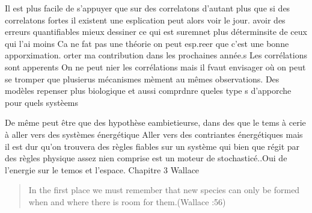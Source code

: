 Il est plus facile de s'appuyer que sur des correlatons d'autant plus
que si des correlatons fortes il existent une esplication peut alors
voir le jour. avoir des erreurs quantifiables mieux dessiner ce qui est
suremnet plus déterminsite de ceux qui l'ai moins Ca ne fat pas une
théorie on peut esp.reer que c'est une bonne apporximation. orter ma
contribution dans les prochaines année.s Les corrélations sont apperents
On ne peut nier les corrélations mais il fvaut envisager où on peut se
tromper que plusierus mécanismes mèment au mêmes observations. Des
modèles repenser plus biologique et aussi comprdnre queles type s
d'apporche pour quels systèems

De même peut être que des hypothèse eambietieurse, dans des que le tems
à cerie à aller vers des systèmes énergétique Aller vers des contriantes
énergétiques mais il est dur qu'on trouvera des règles fiables sur un
système qui bien que régit par des règles physique assez nien comprise
est un moteur de stochasticé..Oui de l'energie sur le temos et l'espace.
Chapitre 3 Wallace

\begin{quote}
In the first place we must remember that new species can only be formed
when and where there is room for them.(Wallace :56)
\end{quote}
